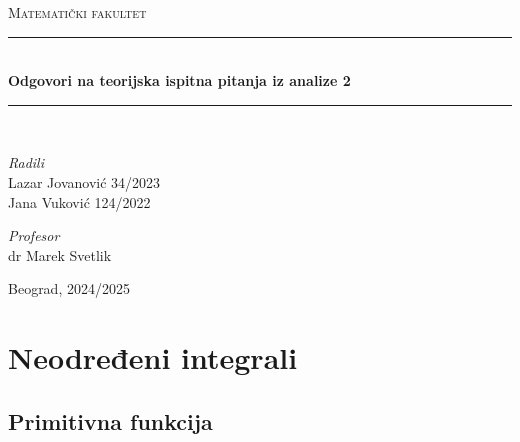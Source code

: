 \documentclass{article}
\begin{document}
\begin{titlepage}
    \newcommand{\HRule}{\rule{\linewidth}{0.4mm}}
    \center
    \textsc{\LARGE Matematički fakultet}\\[7cm]
    \HRule\\[0.4cm]
    {\LARGE\bfseries Odgovori na teorijska ispitna pitanja iz analize 2}
    \\[0.2cm]
    \HRule\\[2cm]

    \vspace{20\baselineskip}
    \begin{minipage}[t]{0.4\textwidth}
        \begin{flushleft}
            \large
            \textit{Radili}\\
            Lazar Jovanović 34/2023\\
            Jana Vuković 124/2022
        \end{flushleft}
    \end{minipage}
    \hspace*{1cm}
    \begin{minipage}[t]{0.4\textwidth}
        \begin{flushright}
            \large
            \textit{Profesor}\\
            dr Marek Svetlik
        \end{flushright}
    \end{minipage}

    \vfill\vfill\vfill\vfill
    {\large Beograd, 2024/2025}
    \vfill

\end{titlepage}

\renewcommand{\contentsname}{Sadržaj}
\tableofcontents

\newpage

\section{Neodređeni integrali}
\subsection{Primitivna funkcija}
\end{document}

